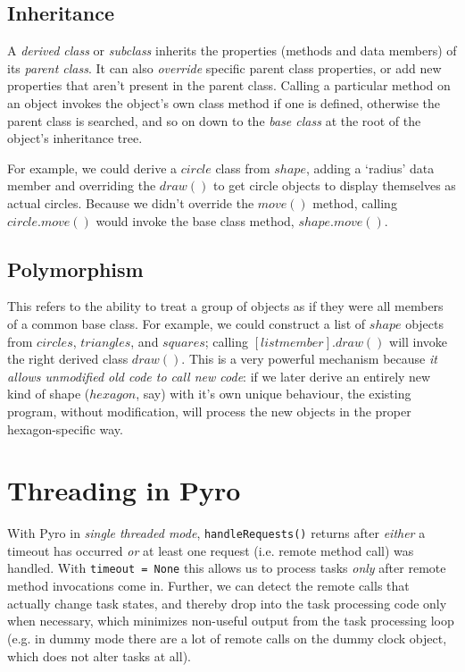 \documentclass[11pt,a4paper]{report}
\begin{document}
\section{Inheritance}

A {\em derived class} or {\em subclass} inherits the properties (methods
and data members) of its {\em parent class}. It can also {\em override}
specific parent class properties, or add new properties that aren't
present in the parent class. Calling a particular method on an object
invokes the object's own class method if one is defined, otherwise the
parent class is searched, and so on down to the {\em base class} at the
root of the object's inheritance tree. 

For example, we could derive a $circle$ class from $shape$, adding a
`radius' data member and overriding the $draw()$ to get circle objects
to display themselves as actual circles.  Because we didn't override the
$move()$ method, calling $circle.move()$ would invoke the base class
method, $shape.move()$. 


\section{Polymorphism}

This refers to the ability to treat a group of objects as if they were
all members of a common base class.  For example, we could construct a
list of $shape$ objects from $circles$, $triangles$, and $squares$;
calling $[list member].draw()$ will invoke the right derived class
$draw()$. This is a very powerful mechanism because {\em it allows
unmodified old code to call new code}: if we later derive an entirely
new kind of shape ($hexagon$, say) with it's own unique behaviour, the
existing program, without modification, will process the new objects in
the proper hexagon-specific way.


\chapter{Threading in Pyro} \label{pyro-appendix}

With Pyro in {\em single threaded mode}, \verb#handleRequests()# returns
after {\em either} a timeout has occurred {\em or} at least one request
(i.e.  remote method call) was handled. With \verb#timeout = None# this
allows us to process tasks {\em only} after remote method invocations
come in.  Further, we can detect the remote calls that actually change
task states, and thereby drop into the task processing code only when
necessary, which minimizes non-useful output from the task processing
loop (e.g. in dummy mode there are a lot of remote calls on the dummy
clock object, which does not alter tasks at all). 
\end{document}
